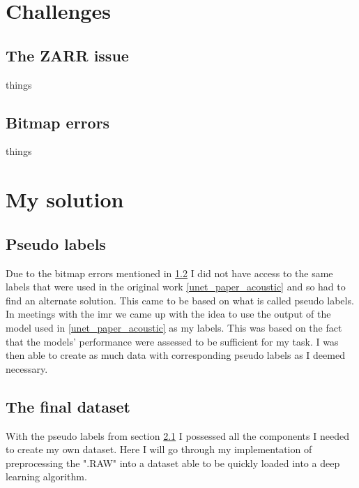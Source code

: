         
\section{Challenges}
    \subsection{The ZARR issue}
        things
    \subsection{Bitmap errors} \label{bitmap_error}
        things

\section{My solution}
    \subsection{Pseudo labels}\label{Pseudo label}
        Due to the bitmap errors mentioned in \ref{bitmap_error} I did not have access to the same labels that were used in the original work \ref{unet_paper_acoustic} and so had to find an alternate solution. This came to be based on what is called pseudo labels. In meetings with the \gls{imr} we came up with the idea to use the output of the model used in \ref{unet_paper_acoustic} as my labels. This was based on the fact that the models' performance were assessed to be sufficient for my task. I was then able to create as much data with corresponding pseudo labels as I deemed necessary.
        
    \subsection{The final dataset}
        With the pseudo labels from section \ref{Pseudo label} I possessed all the components I needed to create my own dataset. Here I will go through my implementation of preprocessing the ".RAW" into a dataset able to be quickly loaded into a deep learning algorithm.
        
